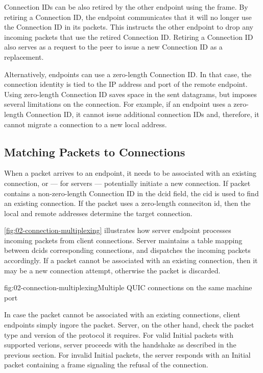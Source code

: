 Connection IDs can be also retired by the other endpoint using the \RETIRECONNECTIONID{} frame. By
retiring a Connection ID, the endpoint communicates that it will no longer use the Connection ID in
its packets. This instructs the other endpoint to drop any incoming packets that use the retired
Connection ID. Retiring a Connection ID also serves as a request to the peer to issue a new
Connection ID as a replacement.

Alternatively, endpoints can use a zero-length Connection ID. In that case, the connection identity
is tied to the IP address and port of the remote endpoint. Using zero-length Connection ID saves
space in the sent datagrams, but imposes several limitations on the connection. For example, if an
endpoint uses a zero-length Connection ID, it cannot issue additional connection IDs and, therefore,
it cannot migrate a connection to a new local address.

\subsection{Matching Packets to Connections}

When a packet arrives to an endpoint, it needs to be associated with an existing connection, or ---
for servers --- potentially initiate a new connection. If packet contains a non-zero-length Connection
ID in the \acrshort{dcid} field, the \gls{cid} is used to find an existing connection. If the packet
uses a zero-length conneciton id, then the local and remote addresses determine the target
connection.

\autoref{fig:02-connection-multiplexing} illustrates how server endpoint processes incoming packets
from client connections. Server maintains a table mapping between \acrshort{dcid}s corresponding
connections, and dispatches the incoming packets accordingly. If a packet cannot be associated with
an existing connection, then it may be a new connection attempt, otherwise the packet is discarded.

\begin{myFigure}{fig:02-connection-multiplexing}{Multiple QUIC connections on the same machine port}



\end{myFigure}

In case the packet cannot be associated with an existing connections, client endpoints simply ingore
the packet. Server, on the other hand, check the packet type and version of the protocol it
requires. For valid Initial packets with supported verions, server proceeds with the handshake as
described in the previous section. For invalid Initial packets, the server responds with an Initial
packet containing a \CONNECTIONCLOSE{} frame signaling the refusal of the connection.

